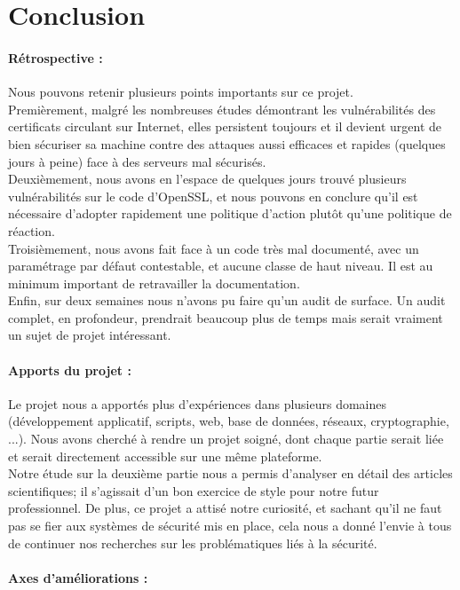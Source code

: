 \section*{Conclusion}

\paragraph{Rétrospective :\\}
Nous pouvons retenir plusieurs points importants sur ce projet.\\
Premièrement, malgré les nombreuses études démontrant les vulnérabilités des certificats circulant sur Internet, elles persistent toujours et il devient urgent de bien sécuriser sa machine contre des attaques aussi efficaces et rapides (quelques jours à peine) face à des serveurs mal sécurisés.\\

Deuxièmement, nous avons en l'espace de quelques jours trouvé plusieurs vulnérabilités sur le code d'OpenSSL, et nous pouvons en conclure qu'il est nécessaire d'adopter rapidement une politique d'action plutôt qu'une politique de réaction.\\

Troisièmement, nous avons fait face à un code très mal documenté, avec un paramétrage par défaut contestable, et aucune classe de haut niveau. Il est au minimum important de retravailler la documentation.\\

Enfin, sur deux semaines nous n'avons pu faire qu'un audit de surface. Un audit complet, en profondeur, prendrait beaucoup plus de temps mais serait vraiment un sujet de projet intéressant.\\

\paragraph{Apports du projet :\\}
Le projet nous a apportés plus d'expériences dans plusieurs domaines (développement applicatif, scripts, web, base de données, réseaux, cryptographie, ...). Nous avons cherché à rendre un projet soigné, dont chaque partie serait liée et serait directement accessible sur une même plateforme.\\
Notre étude sur la deuxième partie nous a permis d'analyser en détail des articles scientifiques; il s'agissait d'un bon exercice de style pour notre futur professionnel. De plus, ce projet a attisé notre curiosité, et sachant qu'il ne faut pas se fier aux systèmes de sécurité mis en place, cela nous a donné l'envie à tous de continuer nos recherches sur les problématiques liés à la sécurité.

\paragraph{Axes d'améliorations :\\}
